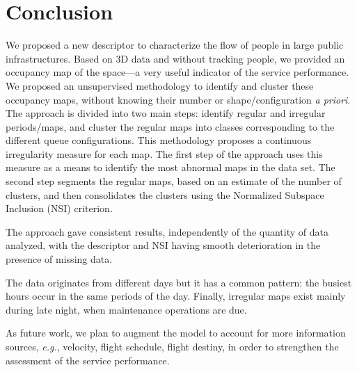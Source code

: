 \section{Conclusion}
\label{sec:conclusion}
%
We proposed a new descriptor to characterize the flow of people in large public infrastructures.
Based on 3D data and without tracking people, we provided an occupancy map of the space---a very useful indicator of the service performance.
We proposed an unsupervised methodology to identify and cluster these occupancy maps, without knowing their number or shape/configuration \emph{a priori}.
The approach is divided into two main steps: identify regular and irregular periods/maps, and cluster the regular maps into classes corresponding to the different queue configurations.
%
This methodology proposes a continuous irregularity measure for each map. The first step of the approach uses this measure as a means to identify the most abnormal maps in the data set. 
The second step segments the regular maps, based on an estimate of the number of clusters, and then consolidates the clusters using the Normalized Subspace Inclusion (NSI) criterion.

The approach gave consistent results, independently of the quantity of data analyzed, with the descriptor and NSI having smooth deterioration in the presence of missing data.

The data originates from different days but it has a common pattern: the busiest hours occur in the same periods of the day.
Finally, irregular maps exist mainly during late night, when maintenance operations are due.

As future work, we plan to augment the model to account for more information sources, \emph{e.g.}, velocity, flight schedule, flight destiny, in order to strengthen the assessment of the service performance.
%

